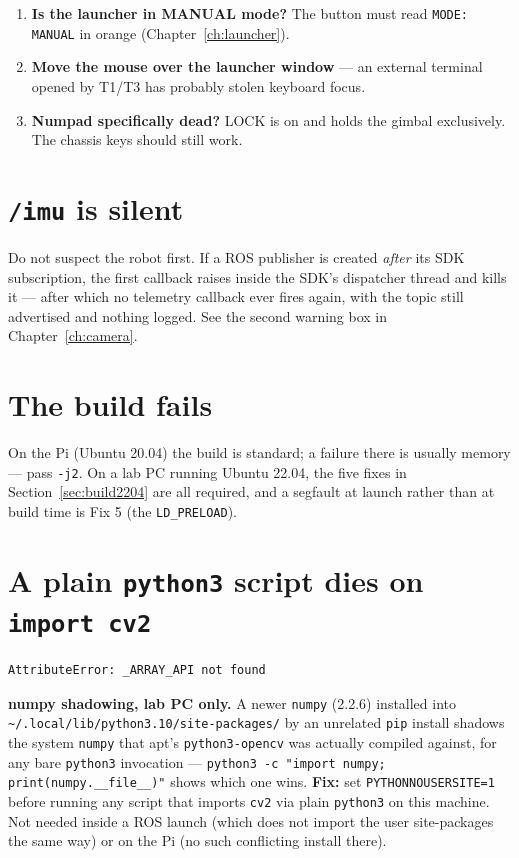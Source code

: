 \documentclass[11pt]{report}
\newenvironment{warningbox}%
  {\begin{lrbox}{\warnbox}\begin{minipage}{0.90\textwidth}}%
  {\end{minipage}\end{lrbox}%
   \begin{center}\fcolorbox{black}{codebg}{\usebox{\warnbox}}\end{center}}
\begin{document}
\begin{enumerate}
  \item \textbf{Is the launcher in MANUAL mode?} The button must read
  \texttt{MODE: MANUAL} in orange (Chapter~\ref{ch:launcher}).
  \item \textbf{Move the mouse over the launcher window} --- an external
  terminal opened by T1/T3 has probably stolen keyboard focus.
  \item \textbf{Numpad specifically dead?} LOCK is on and holds the gimbal
  exclusively. The chassis keys should still work.
\end{enumerate}

\section{\texttt{/imu} is silent}

Do not suspect the robot first. If a ROS publisher is created \emph{after}
its SDK subscription, the first callback raises inside the SDK's dispatcher
thread and kills it --- after which no telemetry callback ever fires again,
with the topic still advertised and nothing logged. See the second warning
box in Chapter~\ref{ch:camera}.

\section{The build fails}

On the Pi (Ubuntu 20.04) the build is standard; a failure there is usually
memory --- pass \texttt{-j2}. On a lab PC running Ubuntu 22.04, the five
fixes in Section~\ref{sec:build2204} are all required, and a segfault at
launch rather than at build time is Fix 5 (the \texttt{LD\_PRELOAD}).

\section{A plain \texttt{python3} script dies on \texttt{import cv2}}

\begin{lstlisting}[style=code]
AttributeError: _ARRAY_API not found
\end{lstlisting}

\begin{warningbox}
\textbf{numpy shadowing, lab PC only.} A newer \texttt{numpy} (2.2.6)
installed into \texttt{\textasciitilde/.local/lib/python3.10/site-packages/}
by an unrelated \texttt{pip} install shadows the system \texttt{numpy} that
apt's \texttt{python3-opencv} was actually compiled against, for any bare
\texttt{python3} invocation --- \texttt{python3 -c "import numpy;
print(numpy.\_\_file\_\_)"} shows which one wins. \textbf{Fix:} set
\texttt{PYTHONNOUSERSITE=1} before running any script that imports
\texttt{cv2} via plain \texttt{python3} on this machine. Not needed inside a
ROS launch (which does not import the user site-packages the same way) or
on the Pi (no such conflicting install there).
\end{warningbox}
\end{document}
